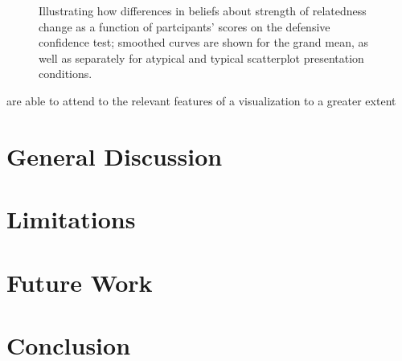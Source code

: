 \documentclass[manuscript,screen,review]{acmart}
\begin{document}
\begin{figure}


\caption{\label{fig-dc-smooth}Illustrating how differences in beliefs
about strength of relatedness change as a function of partcipants'
scores on the defensive confidence test; smoothed curves are shown for
the grand mean, as well as separately for atypical and typical
scatterplot presentation conditions.}

\end{figure}%

are able to attend to the relevant features of a visualization to a
greater extent \citep{okan_2015}

\section{General Discussion}\label{general-discussion}

\section{Limitations}\label{limitations}

\section{Future Work}\label{future-work}

\section{Conclusion}\label{conclusion}




\end{document}
